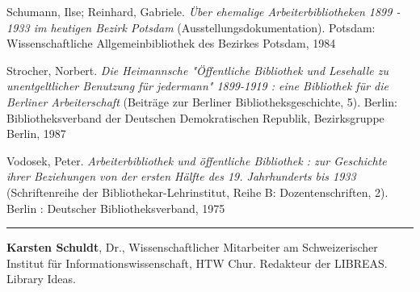 \documentclass[a4paper,
fontsize=11pt,
oneside,
numbers=noperiodatend,
parskip=half-,
bibliography=totoc,
final
]{scrartcl}
\begin{document}
Schumann, Ilse; Reinhard, Gabriele. \emph{Über ehemalige
Arbeiterbibliotheken 1899 - 1933 im heutigen Bezirk Potsdam}
(Ausstellungsdokumentation). Potsdam: Wissenschaftliche
Allgemeinbibliothek des Bezirkes Potsdam, 1984

Strocher, Norbert. \emph{Die Heimannsche "Öffentliche Bibliothek und
Lesehalle zu unentgeltlicher Benutzung für jedermann" 1899-1919 : eine
Bibliothek für die Berliner Arbeiterschaft} (Beiträge zur Berliner
Bibliotheksgeschichte, 5). Berlin: Bibliotheksverband der Deutschen
Demokratischen Republik, Bezirksgruppe Berlin, 1987

Vodosek, Peter. \emph{Arbeiterbibliothek und öffentliche Bibliothek :
zur Geschichte ihrer Beziehungen von der ersten Hälfte des 19.
Jahrhunderts bis 1933} (Schriftenreihe der Bibliothekar-Lehrinstitut,
Reihe B: Dozentenschriften, 2). Berlin : Deutscher Bibliotheksverband,
1975

\begin{center}\rule{0.5\linewidth}{\linethickness}\end{center}

\textbf{Karsten Schuldt}, Dr., Wissenschaftlicher Mitarbeiter am
Schweizerischer Institut für Informationswissenschaft, HTW Chur.
Redakteur der LIBREAS. Library Ideas.
\end{document}

